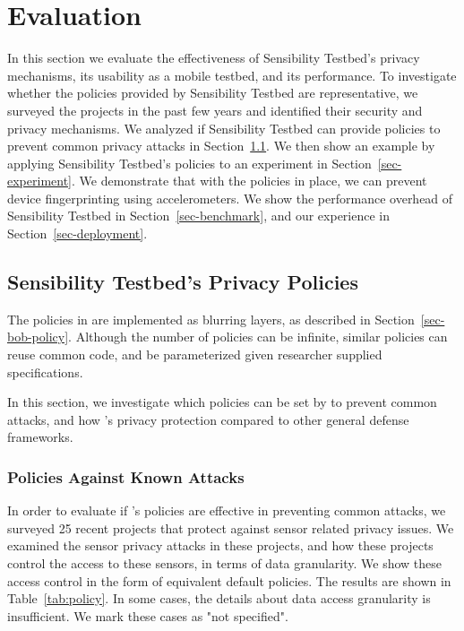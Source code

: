 \section{Evaluation}\label{sec-eval}

In this section we evaluate the effectiveness of Sensibility Testbed's 
privacy mechanisms, its usability as a mobile testbed, and its 
performance. To investigate whether the policies provided by 
Sensibility Testbed are representative, we surveyed the projects
in the past few years and identified their security and privacy 
mechanisms. We analyzed if Sensibility Testbed can provide policies 
to prevent common privacy attacks in Section~\ref{sec-our-policies}. 
We then show an example by applying Sensibility Testbed's 
policies to an experiment in Section~\ref{sec-experiment}. We 
demonstrate that with the policies in place, we can prevent device
fingerprinting using accelerometers. We show the performance overhead of 
Sensibility Testbed in Section~\ref{sec-benchmark}, and our 
experience in Section~\ref{sec-deployment}.

\subsection{Sensibility Testbed's Privacy Policies}\label{sec-our-policies}

The policies in \sysname are implemented as blurring layers, as described
in Section~\ref{sec-bob-policy}. Although the number of policies can be
infinite, similar policies can reuse common code, and be parameterized 
given researcher supplied specifications. 

In this section, we investigate which policies can be set by \sysname to 
prevent common attacks, and how \sysname's privacy protection compared 
to other general defense frameworks.

\subsubsection{Policies Against Known Attacks}
In order to evaluate if \sysname's policies are effective in preventing common 
attacks, we surveyed 25 recent projects that 
protect against sensor related privacy issues. We examined the sensor 
privacy attacks in these projects, and how these projects control the access 
to these sensors, in terms of data granularity. We show these access control 
in the form of equivalent \sysname default policies. The results are shown in 
Table~\ref{tab:policy}. In some cases, the details about data access granularity
is insufficient. We mark these cases as "not specified". 

